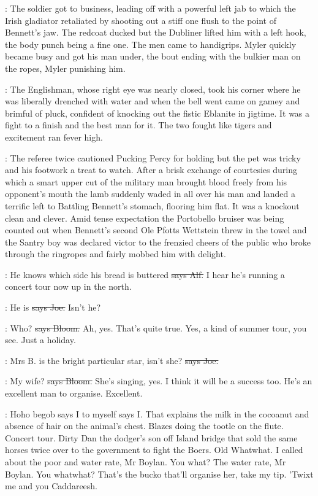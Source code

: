 :
The soldier got to business,
leading off with a
powerful left jab to which the Irish gladiator retaliated by shooting
out a stiff one flush to the point of Bennett's jaw.
The redcoat
ducked but the Dubliner lifted him with a left hook,
the body punch being
a fine one.
The men came to handigrips.
Myler quickly became busy and got
his man under,
the bout ending with the bulkier man on the ropes,
Myler
punishing him.

:
The Englishman,
whose right eye was nearly closed,
took
his corner where he was liberally drenched with water and when the bell
went came on gamey and brimful of pluck,
confident of knocking out the
fistic Eblanite in jigtime.
It was a fight to a finish and the best man
for it.
The two fought like tigers and excitement ran fever high.

:
The referee twice cautioned Pucking Percy for holding but the pet was tricky
and his footwork a treat to watch.
After a brisk exchange of courtesies
during which a smart upper cut of the military man
brought blood freely
from his opponent's mouth the lamb suddenly waded in all over his man and
landed a terrific left to Battling Bennett's stomach,
flooring him flat.
It was a knockout clean and clever.
Amid tense expectation the Portobello
bruiser was being counted out when Bennett's second Ole Pfotts Wettstein
threw in the towel and the Santry boy was declared victor to the frenzied
cheers of the public who broke through the ringropes and fairly mobbed him
with delight.

\bergan:
He knows which side his bread is buttered
\sout{says Alf.}
I hear he's running
a concert tour now up in the north.

\joe:
He is
\sout{says Joe.}
Isn't he?

\Bloom:
Who?
\sout{says Bloom.}
Ah,
yes.
That's quite true.
Yes,
a kind of summer tour,
you see.
Just a holiday.

\joe:
Mrs B.
is the bright particular star,
isn't she?
\sout{says Joe.}

\Bloom:
My wife?
\sout{says Bloom.} She's singing,
yes.
I think it will be a success too.
He's an excellent man to organise.
Excellent.

\Nq:
Hoho begob says I to myself says I.
That explains the milk in the cocoanut
and absence of hair on the animal's chest.
Blazes doing the tootle on the
flute.
Concert tour.
Dirty Dan the dodger's son off Island bridge that
sold the same horses twice over to the government to fight the Boers.
Old
Whatwhat.
I called about the poor and water rate,
Mr Boylan.
You what?
The water rate,
Mr Boylan.
You whatwhat?
That's the bucko that'll
organise her,
take my tip.
'Twixt me and you Caddareesh.

